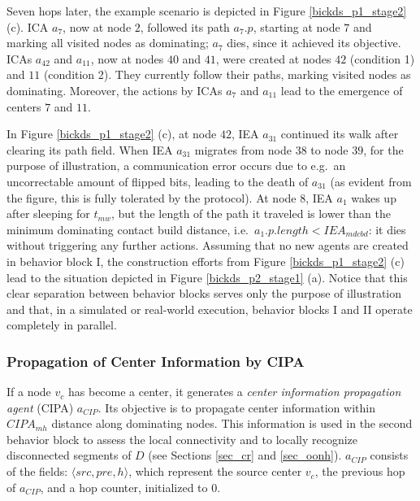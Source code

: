  
Seven hops later, the example scenario is depicted in Figure \ref{bickds_p1_stage2} (c). ICA $a_7$, now at node $2$, followed its path $a_7.p$, starting at node $7$ and marking all visited nodes as dominating; $a_7$ dies, since it achieved its objective. ICAs $a_{42}$ and $a_{11}$, now at nodes $40$ and $41$, were created at nodes $42$ (condition 1) and $11$ (condition 2). They currently follow their paths, marking visited nodes as dominating. Moreover, the actions by ICAs $a_7$ and $a_{11}$ lead to the emergence of centers $7$ and $11$.

In Figure \ref{bickds_p1_stage2} (c), at node $42$, IEA $a_{31}$ continued its walk after clearing its path field. 
When IEA $a_{31}$ migrates from node $38$ to node $39$, for the purpose of illustration, a communication error occurs due to e.g.\ an uncorrectable amount of flipped bits, leading to the death of $a_{31}$ (as evident from the figure, this is fully tolerated by the protocol). At node $8$, IEA $a_1$ wakes up after sleeping for $t_{mw}$, but the length of the path it traveled is lower than the minimum dominating contact build distance, i.e.\ $a_1.p.length < IEA_{mdcbd}$: it dies without triggering any further actions. Assuming that no new agents are created in behavior block I, the construction efforts from Figure \ref{bickds_p1_stage2} (c) lead to the situation depicted in Figure \ref{bickds_p2_stage1} (a). Notice that this clear separation between behavior blocks serves only the purpose of illustration and that, in a simulated or real-world execution, behavior blocks I and II operate completely in parallel.

\exampleEnd





\subsubsection{Propagation of Center Information by CIPA}\label{introcipamh}\label{sec_poci}
If a node $v_c$ has become a center, it generates a \emph{center information propagation agent} (CIPA) $a_{CIP}$. Its objective is to propagate center information within $CIPA_{mh}$ distance along dominating nodes. This information is used in the second behavior block to assess the local connectivity and to locally recognize disconnected segments of $D$ (see Sections \ref{sec_cr} and \ref{sec_oonh}). $a_{CIP}$ consists of the fields: $\langle src,pre, h \rangle$, which represent the source center $v_c$, the previous hop of $a_{CIP}$, and a hop counter, initialized to $0$. 

